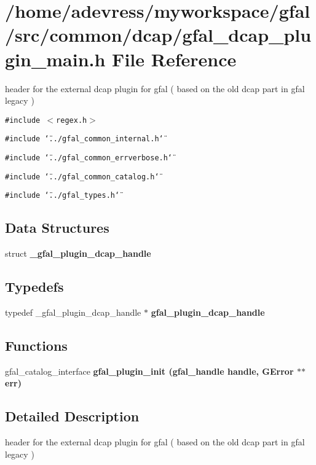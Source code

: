 \section{/home/adevress/myworkspace/gfal/src/common/dcap/gfal\_\-dcap\_\-plugin\_\-main.h File Reference}
\label{gfal__dcap__plugin__main_8h}
header for the external dcap plugin for gfal ( based on the old dcap part in gfal legacy ) 

{\tt \#include $<$regex.h$>$}\par
{\tt \#include \char`\"{}../gfal\_\-common\_\-internal.h\char`\"{}}\par
{\tt \#include \char`\"{}../gfal\_\-common\_\-errverbose.h\char`\"{}}\par
{\tt \#include \char`\"{}../gfal\_\-common\_\-catalog.h\char`\"{}}\par
{\tt \#include \char`\"{}../gfal\_\-types.h\char`\"{}}\par
\subsection*{Data Structures}
\begin{CompactItemize}
\item 
struct \textbf{\_\-gfal\_\-plugin\_\-dcap\_\-handle}
\end{CompactItemize}
\subsection*{Typedefs}
\begin{CompactItemize}
\item 
typedef \_\-gfal\_\-plugin\_\-dcap\_\-handle $\ast$ \textbf{gfal\_\-plugin\_\-dcap\_\-handle}\label{gfal__dcap__plugin__main_8h_74f42d292270fc09b8cf73c32ce80045}

\end{CompactItemize}
\subsection*{Functions}
\begin{CompactItemize}
\item 
gfal\_\-catalog\_\-interface \bf{gfal\_\-plugin\_\-init} (gfal\_\-handle handle, GError $\ast$$\ast$err)
\end{CompactItemize}


\subsection{Detailed Description}
header for the external dcap plugin for gfal ( based on the old dcap part in gfal legacy ) 

